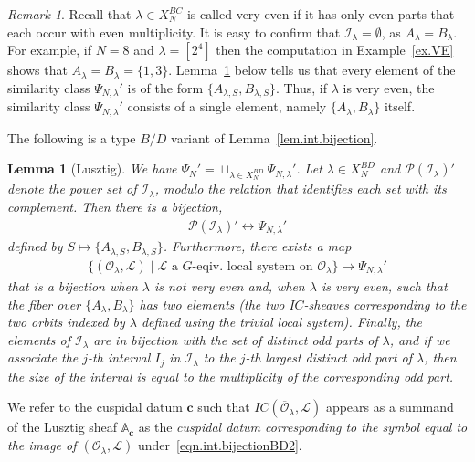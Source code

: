 \documentclass[reqno,11pt]{amsart}
\newtheorem{Lem}[Thm]{Lemma}
\theoremstyle{remark}
\newtheorem{Rem}[Thm]{Remark}
\theoremstyle{remark}
\theoremstyle{definition}
\theoremstyle{definition}
\theoremstyle{definition}
\numberwithin{equation}{section}
\newcommand{\A}{\mathbb{ A}}
\newcommand{\ci}{\mathcal{I}}
\newcommand{\cl}{\mathcal{L}}
\newcommand{\co}{\mathcal{O}}
\begin{document}
\begin{Rem} Recall that $\lambda\in X_N^{BC}$ is called very even if it has only even parts that each occur with even multiplicity. It is easy to confirm that $\ci_\lambda = \emptyset$, as $A_\lambda = B_\lambda$. For example, if $N=8$ and $\lambda = [2^4]$ then the computation in Example~\ref{ex.VE} shows that $A_\lambda = B_\lambda = \{1,3\}$.  Lemma~\ref{lem.int.bijectionBD} below tells us that every element of the similarity class $\Psi_{N,\lambda}'$ is of the form $\{A_{\lambda, S}, B_{\lambda, S}\}$. Thus, if $\lambda$ is very even, the similarity class $\Psi_{N,\lambda}'$ consists of a single element, namely $\{A_\lambda, B_\lambda\}$ itself. 
\end{Rem}

The following is a type $B/D$ variant of Lemma~\ref{lem.int.bijection}.

\begin{Lem}[Lusztig] \label{lem.int.bijectionBD} 
We have $\Psi_N' = \sqcup_{\lambda\in X_N^{BD}} \Psi_{N,\lambda}'$. Let $\lambda\in X_{N}^{BD}$ and $\mathscr{P}(\ci_\lambda)'$ denote the power set of $\ci_\lambda$, modulo the relation that identifies each set with its complement. Then there is a bijection,
\begin{eqnarray}\label{eqn.int.bijectionBD}
\mathscr{P}(\ci_\lambda)'  \leftrightarrow \Psi_{N,\lambda} '
\end{eqnarray}
defined by $S\mapsto \{A_{\lambda, S}, B_{\lambda, S}\}$. Furthermore, there exists a map
\begin{eqnarray}\label{eqn.int.bijectionBD2}
\{ (\co_\lambda, \cl) \mid \text{$\cl$ a $G$-eqiv.~local system on $\co_\lambda$} \} \rightarrow \Psi_{N,\lambda} '
\end{eqnarray}
that is a bijection when $\lambda$ is not very even and, when $\lambda$ is very even, such that the fiber over $\{A_\lambda, B_\lambda\}$ has two elements (the two $IC$-sheaves corresponding to the two orbits indexed by $\lambda$ defined using the trivial local system). Finally, the elements of $\ci_\lambda$ are in bijection with the set of distinct odd parts of $\lambda$, and if we associate the  $j$-th interval $I_j$ in $\ci_\lambda$ to the $j$-th largest distinct odd part of $\lambda$,
then the size of the interval is equal to the multiplicity of the corresponding odd part. 
\end{Lem}

We refer to the cuspidal datum $\mathbf{c}$ such that $IC(\overline{\co}_\lambda, \cl)$ appears as a summand of the Lusztig sheaf $\A_{\mathbf{c}}$ as the \emph{cuspidal datum corresponding to the symbol equal to the image of $(\co_\lambda, \cl)$} under~\eqref{eqn.int.bijectionBD2}.
\end{document}
